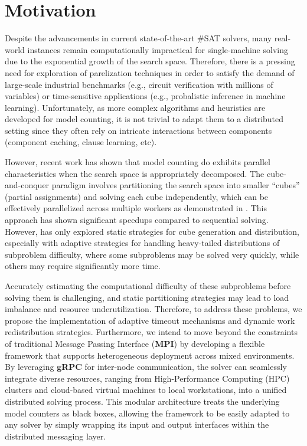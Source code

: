 \documentclass{report}
\begin{document}
\chapter{Motivation}
\label{chapter:motivation}
Despite the advancements in current state-of-the-art \#SAT solvers, many real-world instances remain computationally impractical for
single-machine solving due to the exponential growth of the search space. 
Therefore, there is a pressing need for exploration of parelization techniques in order to satisfy the demand of large-scale industrial benchmarks (e.g., circuit verification with millions of variables)
or time-sensitive applications (e.g., probalistic inference in machine learning). Unfortunately, as more complex algorithms and heuristics are developed for model counting,
it is not trivial to adapt them to a distributed setting since they often rely on intricate interactions between components (component caching, clause learning, etc).

However, recent work has shown that model counting do exhibits parallel characteristics when the search space is appropriately decomposed. 
The cube-and-conquer paradigm \cite{cube-conquer} involves partitioning the search space into smaller ``cubes'' (partial assignments) and solving each cube independently, 
which can be effectively parallelized across multiple workers as demonstrated in \cite{KR2025-65}.
This approach has shown significant speedups compared to sequential solving.
However, \cite{KR2025-65} has only explored static strategies for cube generation and distribution, especially with adaptive strategies for 
handling heavy-tailed distributions of subproblem difficulty, where some subproblems may be solved very quickly, 
while others may require significantly more time. 

Accurately estimating the computational difficulty of these subproblems before solving them is challenging, 
and static partitioning strategies may lead to load imbalance and resource underutilization.
Therefore, to address these problems, we propose the 
implementation of adaptive timeout mechanisms and dynamic work redistribution strategies.
Furthermore, we intend to move beyond the constraints of traditional Message Passing Interface (\textbf{MPI}) 
by developing a flexible framework that supports heterogeneous 
deployment across mixed environments. By leveraging \textbf{gRPC} for inter-node communication, 
the solver can seamlessly integrate diverse resources, ranging from High-Performance Computing (HPC) clusters and cloud-based virtual machines to local workstations, 
into a unified distributed solving process. 
This modular architecture treats the underlying model counters as black boxes, 
allowing the framework to be easily adapted to any solver by 
simply wrapping its input and output interfaces within the distributed messaging layer.
\end{document}
